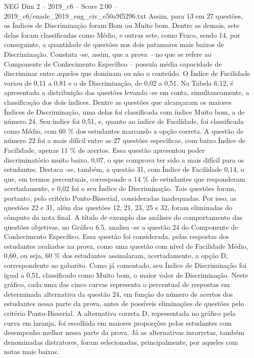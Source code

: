 \begin{textsample}{NEG Dim 2 – 2019\_c6 – Score 2.00 – 2019\_c6/enade\_2019\_eng\_civ\_e50a9f5296.txt}
Assim, para 13 em 27 questões, os Índices de Discriminação foram Bom ou Muito bom.
Dentre as demais, sete delas foram classificadas como Médio, e outras sete, como Fraco, sendo 14, por conseguinte, a quantidade de questões nos dois patamares mais baixos de Discriminação.
Constata -se, assim, que a prova – no que se refere ao Componente de Conhecimento Específico – possuía média capacidade de discriminar entre aqueles que dominam ou não o conteúdo.
O Índice de Facilidade variou de 0,11 a 0,81 e o de Discriminação, de 0,02 a 0,51.
Na Tabela 6.12, é apresentada a distribuição das questões levando -se em conta, simultaneamente, a classificação dos dois índices.
Dentre as questões que alcançaram os maiores Índices de Discriminação, uma delas foi classificada com índice Muito bom, a de número 24.
Seu índice foi 0,51, e, quanto ao índice de Facilidade, foi classificada como Médio, com 60 \% dos estudantes marcando a opção correta.
A questão de número 22 foi a mais difícil entre as 27 questões específicas, com baixo Índice de Facilidade, apenas 11 \% de acertos.
Essa questão apresentou poder discriminatório muito baixo, 0,07, o que comprova ter sido a mais difícil para os estudantes.
Destaca -se, também, a questão 31, com Índice de Facilidade 0,14, o que, em termos percentuais, corresponde a 14 \% de estudantes que responderam acertadamente, e 0,02 foi o seu Índice de Discriminação.
Tais questões foram, portanto, pelo critério Ponto-Bisserial, consideradas inadequadas.
Por isso, as questões 22 e 31, além das questões 12, 21, 23, 25 e 32, foram eliminadas do cômputo da nota final.
A título de exemplo das análises do comportamento das questões objetivas, no Gráfico 6.5, analisa -se a questão 24 do Componente de Conhecimento Específico.
Essa questão foi considerada, pelas respostas dos estudantes avaliados na prova, como uma questão com nível de Facilidade Médio, 0,60, ou seja, 60 \% dos estudantes assinalaram, acertadamente, a opção D, correspondente ao gabarito.
Como já comentado, seu Índice de Discriminação foi igual a 0,51, classificado como Muito bom, o maior valor de Discriminação.
Neste gráfico, cada uma das cinco curvas representa o percentual de respostas em determinada alternativa da questão 24, em função do número de acertos dos estudantes nessa parte da prova, antes de possíveis eliminações de questões pelo critério Ponto-Bisserial.
A alternativa correta D, representada no gráfico pela curva em laranja, foi escolhida em maiores proporções pelos estudantes com desempenho melhor nessa parte da prova.
Já as alternativas incorretas, também denominadas distratores, foram selecionadas, principalmente, por aqueles com notas mais baixas.

\end{textsample}
